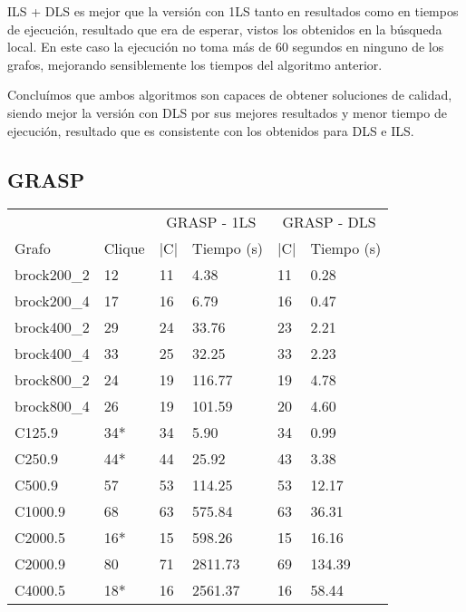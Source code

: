 ILS + DLS es mejor que la versión con 1LS tanto en resultados como en tiempos de
ejecución, resultado que era de esperar, vistos los obtenidos en la búsqueda local.
En este caso la ejecución no toma más de $60$ segundos en ninguno de los grafos,
mejorando sensiblemente los tiempos del algoritmo anterior.

Concluímos que ambos algoritmos son capaces de obtener soluciones de calidad,
siendo mejor la versión con DLS por sus mejores resultados y menor tiempo de
ejecución, resultado que es consistente con los obtenidos para DLS e ILS.

\subsection{GRASP}

\begin{small}
\begin{longtable}{l l l l l l}
  \label{table:grasp}\\
    & & \multicolumn{2}{c}{GRASP - 1LS} & \multicolumn{2}{c}{GRASP - DLS} \\ \cline{3-6}
    Grafo              & Clique & |C| & Tiempo (s) & |C| & Tiempo (s) \\ \hline
    \endhead
    \endfoot
    brock200\_2        & 12 & 11 & 4.38 & 11 & 0.28\\ \hline
    brock200\_4        & 17 & 16 & 6.79 & 16 & 0.47\\ \hline
    brock400\_2        & 29 & 24 & 33.76 & 23 & 2.21\\ \hline
    brock400\_4        & 33 & 25 & 32.25 & 33 & 2.23\\ \hline
    brock800\_2        & 24 & 19 & 116.77 & 19 & 4.78\\ \hline
    brock800\_4        & 26 & 19 & 101.59 & 20 & 4.60\\ \hline
    C125.9             & 34* & 34 & 5.90 & 34 & 0.99\\ \hline
    C250.9             & 44* & 44 & 25.92 & 43 & 3.38\\ \hline
    C500.9             & 57 & 53 & 114.25 & 53 & 12.17\\ \hline
    C1000.9            & 68 & 63 & 575.84 & 63 & 36.31\\ \hline
    C2000.5            & 16* & 15 & 598.26 & 15 & 16.16\\ \hline
    C2000.9            & 80 & 71 & 2811.73 & 69 & 134.39\\ \hline
    C4000.5            & 18* & 16 & 2561.37 & 16 & 58.44\\ \hline

\end{longtable}
\end{small}
